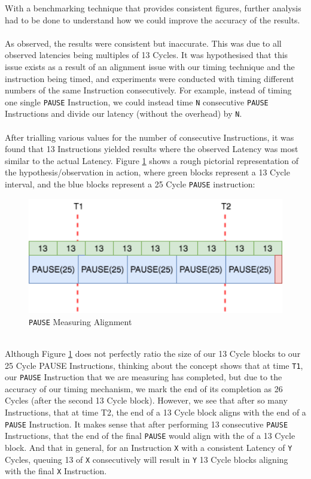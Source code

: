 \documentclass[bsc,frontabs,twoside,singlespacing,parskip,deptreport]{infthesis}     %
\begin{document}
With a benchmarking technique that provides consistent figures, further analysis had to be done to understand how we could improve the accuracy of the results. \\
\\
As observed, the results were consistent but inaccurate. This was due to all observed latencies being multiples of 13 Cycles. It was hypothesised that this issue exists as a result of an alignment issue with our timing technique and the instruction being timed, and experiments were conducted with timing different numbers of the same Instruction consecutively. For example, instead of timing one single \texttt{PAUSE} Instruction, we could instead time \texttt{N} consecutive \texttt{PAUSE} Instructions and divide our latency (without the overhead) by \texttt{N}. \\
\\
After trialling various values for the number of consecutive Instructions, it was found that 13 Instructions yielded results where the observed Latency was most similar to the actual Latency. Figure \ref{fig:measure-alignment} shows a rough pictorial representation of the hypothesis/observation in action, where green blocks represent a 13 Cycle interval, and the blue blocks represent a 25 Cycle \texttt{PAUSE} instruction:
\\
\begin{figure}[h]
    \includegraphics[width=12cm]{MeasureAlignment.png}
    \centering
    \caption{\texttt{PAUSE} Measuring Alignment}
    \label{fig:measure-alignment}
\end{figure}
\\
Although Figure \ref{fig:measure-alignment} does not perfectly ratio the size of our 13 Cycle blocks to our 25 Cycle PAUSE Instructions, thinking about the concept shows that at time \texttt{T1}, our \texttt{PAUSE} Instruction that we are measuring has completed, but due to the accuracy of our timing mechanism, we mark the end of its completion as 26 Cycles (after the second 13 Cycle block). However, we see that after so many Instructions, that at time T2, the end of a 13 Cycle block aligns with the end of a \texttt{PAUSE} Instruction. It makes sense that after performing 13 consecutive \texttt{PAUSE} Instructions, that the end of the final \texttt{PAUSE} would align with the of a 13 Cycle block. And that in general, for an Instruction \texttt{X} with a consistent Latency of \texttt{Y} Cycles, queuing 13 of \texttt{X} consecutively will result in \texttt{Y} 13 Cycle blocks aligning with the final \texttt{X} Instruction.  \\
\end{document}
